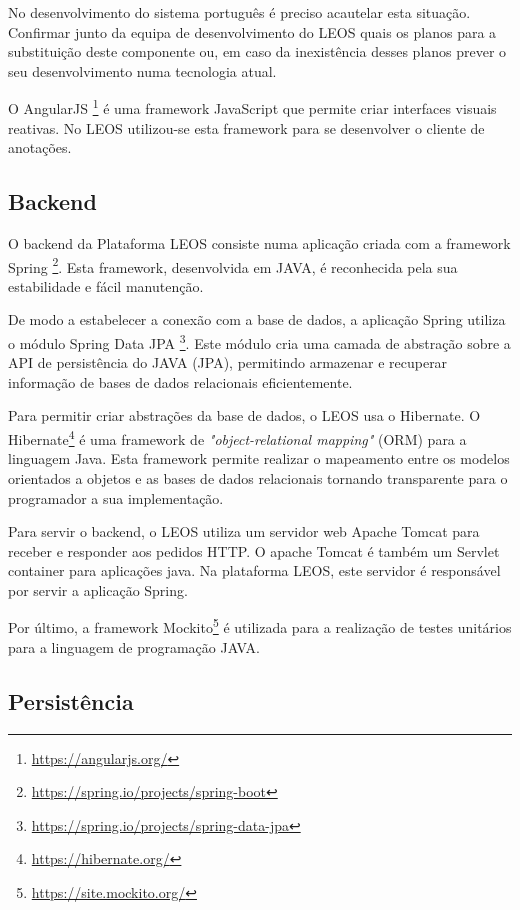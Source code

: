 No desenvolvimento do sistema português é preciso acautelar esta situação.
Confirmar junto da equipa de desenvolvimento do LEOS quais os planos para a substituição deste componente ou, em caso 
da inexistência desses planos prever o seu desenvolvimento numa tecnologia atual.

O AngularJS \footnote{\url{https://angularjs.org/}} é uma framework JavaScript que permite criar interfaces visuais reativas. 
No LEOS utilizou-se esta framework para se desenvolver o cliente de anotações.


\subsection{Backend}

O backend da Plataforma LEOS consiste numa aplicação criada com a framework Spring \footnote{\url{https://spring.io/projects/spring-boot}}. 
Esta framework, desenvolvida em JAVA, é reconhecida pela sua estabilidade e fácil manutenção.

De modo a estabelecer a conexão com a base de dados, a aplicação Spring utiliza o módulo Spring Data JPA \footnote{\url{https://spring.io/projects/spring-data-jpa}}. 
Este módulo cria uma camada de abstração sobre a API de persistência do JAVA (JPA), permitindo armazenar e recuperar 
informação de bases de dados relacionais eficientemente.

Para permitir criar abstrações da base de dados, o LEOS usa o Hibernate.
O Hibernate\footnote{\url{https://hibernate.org/}} é uma framework de \emph{"object-relational mapping"} (ORM) para a linguagem Java. 
Esta framework permite realizar o mapeamento entre os modelos orientados a objetos e as bases de dados relacionais tornando 
transparente para o programador a sua implementação.

Para servir o backend, o LEOS utiliza um servidor web Apache Tomcat para receber e responder aos pedidos HTTP. 
O apache Tomcat é também um Servlet container para aplicações java. 
Na plataforma LEOS, este servidor é responsável por servir a aplicação Spring.

Por último, a framework Mockito\footnote{\url{https://site.mockito.org/}} é utilizada para a realização de testes unitários 
para a linguagem de programação JAVA.

\subsection{Persistência}
 
